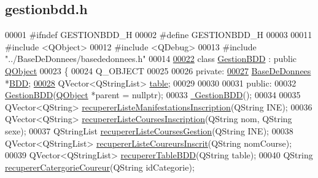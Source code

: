 \hypertarget{gestionbdd_8h_source}{}\subsection{gestionbdd.\+h}
\label{gestionbdd_8h_source}

\begin{DoxyCode}
00001 \textcolor{preprocessor}{#ifndef GESTIONBDD\_H}
00002 \textcolor{preprocessor}{#define GESTIONBDD\_H}
00003 
00011 \textcolor{preprocessor}{#include <QObject>}
00012 \textcolor{preprocessor}{#include <QDebug>}
00013 \textcolor{preprocessor}{#include "../BaseDeDonnees/basededonnees.h"}
00014 
\hyperlink{class_gestion_b_d_d}{00022} \textcolor{keyword}{class }\hyperlink{class_gestion_b_d_d}{GestionBDD} : \textcolor{keyword}{public} \hyperlink{class_q_object}{QObject}
00023 \{
00024     Q\_OBJECT
00025 
00026 \textcolor{keyword}{private}:
\hyperlink{class_gestion_b_d_d_a1bd17cbf5754eb6e54ae351f1d02dca2}{00027}     \hyperlink{class_base_de_donnees}{BaseDeDonnees} *\hyperlink{class_gestion_b_d_d_a1bd17cbf5754eb6e54ae351f1d02dca2}{BDD};
\hyperlink{class_gestion_b_d_d_afa3e974fb5afa7f25f275a662e182960}{00028}     QVector<QStringList> \hyperlink{class_gestion_b_d_d_afa3e974fb5afa7f25f275a662e182960}{table};
00029 
00030 
00031 \textcolor{keyword}{public}:
00032     \hyperlink{class_gestion_b_d_d_a406bdb9b1714b204fa6fab015baffc27}{GestionBDD}(\hyperlink{class_q_object}{QObject} *parent = \textcolor{keyword}{nullptr});
00033     \hyperlink{class_gestion_b_d_d_a4d98c4008182a5749c57c97772b3c303}{~GestionBDD}();
00034 
00035     QVector<QString> \hyperlink{class_gestion_b_d_d_a6c1ab5e51fbd6c92bb096badbeac0df5}{recupererListeManifestationsInscription}(QString
       INE);
00036     QVector<QString> \hyperlink{class_gestion_b_d_d_a59ef29e28993c64aa4d5a8c42a8fb08d}{recupererListeCoursesInscription}(QString nom, QString 
      sexe);
00037     QStringList \hyperlink{class_gestion_b_d_d_ac35de40fd5860b3130f71788ecaa5ef3}{recupererListeCoursesGestion}(QString INE);
00038     QVector<QStringList> \hyperlink{class_gestion_b_d_d_a09b547cb065256acd269c64e273c93fd}{recupererListeCoureursInscrit}(QString nomCourse);
00039     QVector<QStringList> \hyperlink{class_gestion_b_d_d_a2b44ebc5bf5b1a7babde6512817a85b4}{recupererTableBDD}(QString table);
00040     QString \hyperlink{class_gestion_b_d_d_ad7b0117ad5d55f21e6f00858038f4a85}{recupererCatergorieCoureur}(QString idCategorie);

\end{DoxyCode}
